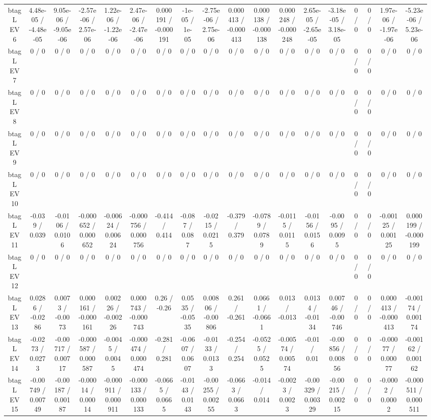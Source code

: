 \documentclass[10pt]{article}
\begin{document}
\begin{table}[htbp]
\begin{center}
\begin{tabular}{|c|c|c|c|c|c|c|c|c|c|c|c|c|c|c|c|c|c|}
  btag L EV 6 & 4.48e-05 / -4.48e-05 & 9.05e-06 / -9.05e-06 & -2.57e-06 / 2.57e-06 & 1.22e-06 / -1.22e-06 & 2.47e-06 / -2.47e-06 & 0.000191 / -0.000191 & -1e-05 / 1e-05 & -2.75e-06 / 2.75e-06 & 0.000413 / -0.000413 & 0.000138 / -0.000138 & 0.000248 / -0.000248 & 2.65e-05 / -2.65e-05 & -3.18e-05 / 3.18e-05 & 0 / 0 & 0 / 0 & 1.97e-06 / -1.97e-06 & -5.23e-06 / 5.23e-06 \\ 
  btag L EV 7 & 0 / 0 & 0 / 0 & 0 / 0 & 0 / 0 & 0 / 0 & 0 / 0 & 0 / 0 & 0 / 0 & 0 / 0 & 0 / 0 & 0 / 0 & 0 / 0 & 0 / 0 & 0 / 0 & 0 / 0 & 0 / 0 & 0 / 0 \\ 
  btag L EV 8 & 0 / 0 & 0 / 0 & 0 / 0 & 0 / 0 & 0 / 0 & 0 / 0 & 0 / 0 & 0 / 0 & 0 / 0 & 0 / 0 & 0 / 0 & 0 / 0 & 0 / 0 & 0 / 0 & 0 / 0 & 0 / 0 & 0 / 0 \\ 
  btag L EV 9 & 0 / 0 & 0 / 0 & 0 / 0 & 0 / 0 & 0 / 0 & 0 / 0 & 0 / 0 & 0 / 0 & 0 / 0 & 0 / 0 & 0 / 0 & 0 / 0 & 0 / 0 & 0 / 0 & 0 / 0 & 0 / 0 & 0 / 0 \\ 
  btag L EV 10 & 0 / 0 & 0 / 0 & 0 / 0 & 0 / 0 & 0 / 0 & 0 / 0 & 0 / 0 & 0 / 0 & 0 / 0 & 0 / 0 & 0 / 0 & 0 / 0 & 0 / 0 & 0 / 0 & 0 / 0 & 0 / 0 & 0 / 0 \\ 
  btag L EV 11 & -0.039 / 0.039 & -0.0106 / 0.0106 & -0.000652 / 0.000652 & -0.00624 / 0.00624 & -0.000756 / 0.000756 & -0.414 / 0.414 & -0.087 / 0.087 & -0.0215 / 0.0215 & -0.379 / 0.379 & -0.0789 / 0.0789 & -0.0115 / 0.0115 & -0.0156 / 0.0156 & -0.0095 / 0.0095 & 0 / 0 & 0 / 0 & -0.00125 / 0.00125 & 0.000199 / -0.000199 \\ 
  btag L EV 12 & 0 / 0 & 0 / 0 & 0 / 0 & 0 / 0 & 0 / 0 & 0 / 0 & 0 / 0 & 0 / 0 & 0 / 0 & 0 / 0 & 0 / 0 & 0 / 0 & 0 / 0 & 0 / 0 & 0 / 0 & 0 / 0 & 0 / 0 \\ 
  btag L EV 13 & 0.0286 / -0.0286 & 0.0073 / -0.0073 & 0.000161 / -0.000161 & 0.00226 / -0.00226 & 0.000743 / -0.000743 & 0.26 / -0.26 & 0.0535 / -0.0535 & 0.00806 / -0.00806 & 0.261 / -0.261 & 0.0661 / -0.0661 & 0.013 / -0.013 & 0.0134 / -0.0134 & 0.00746 / -0.00746 & 0 / 0 & 0 / 0 & 0.000413 / -0.000413 & -0.00174 / 0.00174 \\ 
  btag L EV 14 & -0.0273 / 0.0273 & -0.00717 / 0.00717 & -0.000587 / 0.000587 & -0.0045 / 0.0045 & -0.000474 / 0.000474 & -0.281 / 0.281 & -0.0607 / 0.0607 & -0.0133 / 0.0133 & -0.254 / 0.254 & -0.0525 / 0.0525 & -0.00574 / 0.00574 & -0.01 / 0.01 & -0.00856 / 0.00856 & 0 / 0 & 0 / 0 & -0.00077 / 0.00077 & -0.00162 / 0.00162 \\ 
  btag L EV 15 & -0.00749 / 0.00749 & -0.00187 / 0.00187 & -0.00014 / 0.00014 & -0.000911 / 0.000911 & -0.000133 / 0.000133 & -0.0665 / 0.0665 & -0.0143 / 0.0143 & -0.00255 / 0.00255 & -0.0663 / 0.0663 & -0.014 / 0.014 & -0.0023 / 0.0023 & -0.00329 / 0.00329 & -0.00215 / 0.00215 & 0 / 0 & 0 / 0 & -0.0002 / 0.0002 & -0.000511 / 0.000511 \\ 

\end{tabular}
\end{center}
\end{table}
\end{document}
